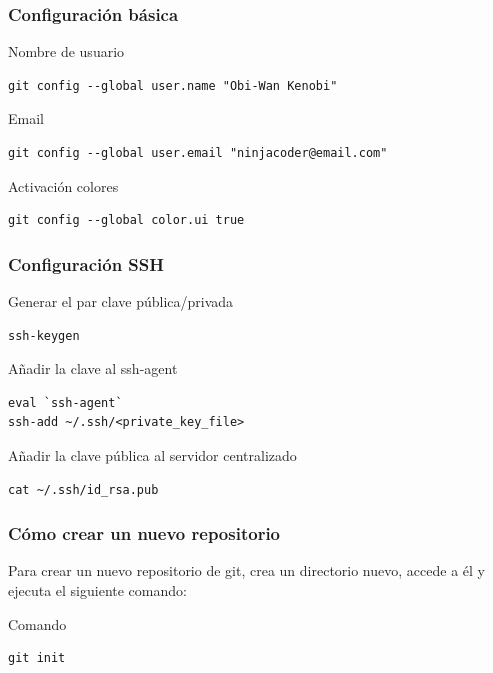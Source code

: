 \documentclass{beamer}
\begin{document}
\begin{frame}[fragile]
\frametitle{Configuración básica}
\begin{block}{Nombre de usuario}
\begin{verbatim}
git config --global user.name "Obi-Wan Kenobi"
\end{verbatim}
\end{block}
\begin{block}{Email}
\begin{verbatim}
git config --global user.email "ninjacoder@email.com"
\end{verbatim}
\end{block}
\begin{block}{Activación colores}
\begin{verbatim}
git config --global color.ui true
\end{verbatim}
\end{block}
\end{frame}

\begin{frame}[fragile]
\frametitle{Configuración SSH}
\begin{block}{Generar el par clave pública/privada}
\begin{verbatim}
ssh-keygen
\end{verbatim}
\end{block}
\begin{block}{Añadir la clave al ssh-agent}
\begin{verbatim}
eval `ssh-agent`
ssh-add ~/.ssh/<private_key_file>
\end{verbatim}
\end{block}
\begin{block}{Añadir la clave pública al servidor centralizado}
\begin{verbatim}
cat ~/.ssh/id_rsa.pub
\end{verbatim}
\end{block}
\end{frame}

\begin{frame}[fragile]
\frametitle{Cómo crear un nuevo repositorio}
Para crear un nuevo repositorio de git, crea un directorio nuevo, accede a él y ejecuta el siguiente comando:
\begin{block}{Comando}
\begin{verbatim}
git init
\end{verbatim}
\end{block}
\end{frame}
\end{document}
